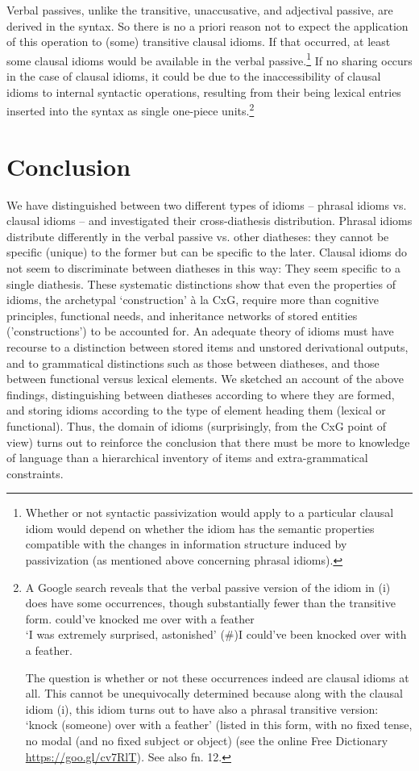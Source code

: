 \documentclass[output=paper,
modfonts
]{LSP/langsci}
\begin{document}
Verbal passives, unlike the transitive, unaccusative, and adjectival
passive, are derived in the syntax. So there is no a priori reason not
to expect the application of this operation to (some) transitive clausal
idioms. If that occurred, at least some clausal idioms would be
available in the verbal passive.\footnote{Whether or not syntactic
  passivization would apply to a particular clausal idiom would depend
  on whether the idiom has the semantic properties compatible with the
  changes in information structure induced by passivization (as
  mentioned above concerning phrasal idioms).} If no sharing occurs in
the case of clausal idioms, it could be due to the inaccessibility of
clausal idioms to internal syntactic operations, resulting from their
being lexical entries inserted into the syntax as single one-piece
units.\footnote{A Google search reveals that the verbal passive version
  of the idiom in (i) does have some occurrences, though substantially
  fewer than the transitive form.
\ea could've knocked me over with a feather\\
  `I was extremely surprised, astonished'
\ex(\#)I could've been knocked over with a feather.
\z

  The question is whether or not these occurrences indeed are clausal
  idioms at all. This cannot be unequivocally determined because along
  with the clausal idiom (i), this idiom turns out to have also a
  phrasal transitive version: `knock (someone) over with a feather'
  (listed in this form, with no fixed tense, no modal (and no fixed
  subject or object) (see the online Free Dictionary
  \url{https://goo.gl/cv7RlT})\emph{.} See also fn. 12.}

\section{Conclusion}

We have distinguished between two different types of idioms -- phrasal
idioms vs. clausal idioms -- and investigated their cross-diathesis
distribution. Phrasal idioms distribute differently in the verbal
passive vs. other diatheses: they cannot be specific (unique) to the
former but can be specific to the later. Clausal idioms do not seem to
discriminate between diatheses in this way: They seem specific to a
single diathesis. These systematic distinctions show that even the
properties of idioms, the archetypal `construction' à la CxG, require
more than cognitive principles, functional needs, and inheritance
networks of stored entities ('constructions') to be accounted for. An
adequate theory of idioms must have recourse to a distinction between
stored items and unstored derivational outputs, and to grammatical
distinctions such as those between diatheses, and those between
functional versus lexical elements. We sketched an account of the above
findings, distinguishing between diatheses according to where they are
formed, and storing idioms according to the type of element heading them
(lexical or functional). Thus, the domain of idioms (surprisingly, from
the CxG point of view) turns out to reinforce the conclusion that there
must be more to knowledge of language than a hierarchical inventory of
items and extra-grammatical constraints.
\end{document}
